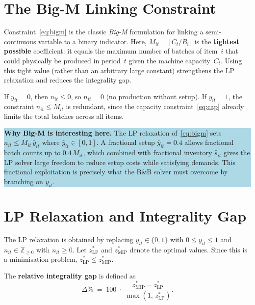 \documentclass[11pt,a4paper]{article}
\begin{document}
\section{The Big-M Linking Constraint}

Constraint~\eqref{eq:bigm} is the classic \emph{Big-M} formulation for
linking a semi-continuous variable to a binary indicator.  Here,
$M_{it}=\lfloor C_t/B_i\rfloor$ is the \textbf{tightest possible} coefficient:
it equals the maximum number of batches of item~$i$ that could physically be
produced in period~$t$ given the machine capacity~$C_t$.  Using this tight
value (rather than an arbitrary large constant) strengthens the LP relaxation
and reduces the integrality gap.

If $y_{it}=0$, then $n_{it}\le 0$, so $n_{it}=0$ (no production without
setup).  If $y_{it}=1$, the constraint $n_{it}\le M_{it}$ is redundant,
since the capacity constraint~\eqref{eq:cap} already limits the total batches
across all items.

\colorbox{lightblue}{\parbox{0.96\textwidth}{%
\textbf{Why Big-M is interesting here.}
The LP relaxation of~\eqref{eq:bigm} sets $n_{it}\le M_{it}\,\hat{y}_{it}$
where $\hat{y}_{it}\in[0,1]$.  A fractional setup $\hat{y}_{it}=0.4$ allows
fractional batch counts up to $0.4\,M_{it}$, which combined with
fractional inventory $\hat{s}_{it}$ gives the LP solver large freedom to
reduce setup costs while satisfying demands.  This fractional exploitation is
precisely what the B\&B solver must overcome by branching on $y_{it}$.
}}

\section{LP Relaxation and Integrality Gap}

The LP relaxation is obtained by replacing
$y_{it}\in\{0,1\}$ with $0\le y_{it}\le 1$ and
$n_{it}\in\mathbb{Z}_{\ge 0}$ with $n_{it}\ge 0$.
Let $z^*_{\mathrm{LP}}$ and $z^*_{\mathrm{MIP}}$ denote the optimal values.
Since this is a minimisation problem, $z^*_{\mathrm{LP}}\le z^*_{\mathrm{MIP}}$.

The \textbf{relative integrality gap} is defined as
\[
  \Delta\% \;=\; 100\;\cdot\;
  \frac{z^*_{\mathrm{MIP}} - z^*_{\mathrm{LP}}}{\max(1,\,z^*_{\mathrm{LP}})}.
\]
\end{document}
